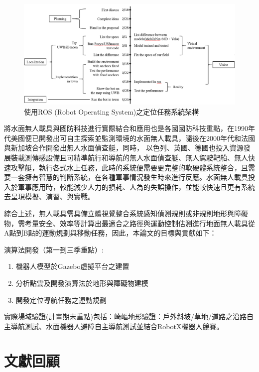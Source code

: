 \begin{figure}[tb]
	\includegraphics[width=1.8\columnwidth]{images/sys-architecture.png}
	\centering
	\caption{使用ROS (Robot Operating System)之定位任務系統架構}
	\label{figure:localization_sys_architecture}
\end{figure}

將水面無人載具與國防科技進行實際結合和應用也是各國國防科技重點，在1990年代美國便已開發出可自主探索並監測環境的水面無人載具，隨後在2000年代和法國與新加坡合作開發出無人水面偵查艇，同時， 以色列、英國、德國也投入資源發展裝載測傳感設備且可精準航行和導航的無人水面偵查艇、無人駕駛靶船、無人快速攻擊艇，執行各式水上任務，此時的系統便需要更完整的軟硬體系統整合，且需要一套擁有智慧的判斷系統，在各種軍事情況發生時來進行反應。水面無人載具投入於軍事應用時，較能減少人力的損耗、人為的失誤操作，並能較快速且更有系統去呈現模擬、演習、與實戰。

綜合上述，無人載具需具備立體視覺整合系統感知偵測規則或非規則地形與障礙物，需考量安全、效率等計算出最適合之路徑與運動控制估測進行地面無人載具從A點到B點的運動規劃與移動任務，因此，本論文的目標與貢獻如下：

演算法開發（第一到三季重點）:
\begin{enumerate}
\item
機器人模型於Gazebo虛擬平台之建置
\item 
分析點雲及開發演算法於地形與障礙物建模
\item 
開發定位導航任務之運動規劃
\end{enumerate}

實際場域驗證(計畫期末重點)包括：崎嶇地形驗證：戶外斜坡/草地/道路之沿路自主導航測試、水面機器人避障自主導航測試並結合RobotX機器人競賽。

\section{文獻回顧}

